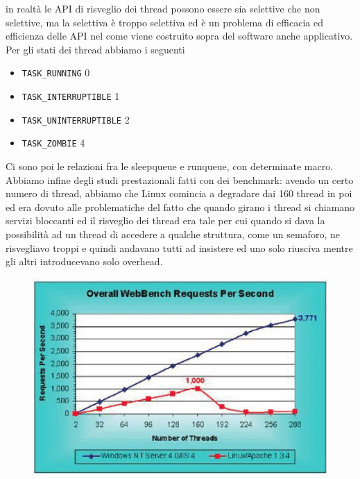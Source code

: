 \documentclass[12pt, oneside]{extbook}
\begin{document}
in realtà le API di risveglio dei thread possono essere sia selettive che non selettive, ma la selettiva è troppo selettiva ed è un problema di efficacia ed efficienza delle API nel come viene costruito sopra del software anche applicativo.\\Per gli stati dei thread abbiamo i seguenti
\begin{itemize}
\item \texttt{TASK\_RUNNING} 0
\item \texttt{TASK\_INTERRUPTIBLE}	1
\item \texttt{TASK\_UNINTERRUPTIBLE}	2
\item \texttt{TASK\_ZOMBIE} 4
\end{itemize}
Ci sono poi le relazioni fra le sleepqueue e runqueue, con determinate macro.\\Abbiamo infine degli studi prestazionali fatti con dei benchmark: avendo un certo numero di thread, abbiamo che Linux comincia a degradare dai 160 thread in poi ed era dovuto alle problematiche del fatto che quando girano i thread si chiamano servizi bloccanti ed il risveglio dei thread era tale per cui quando si dava la possibilità ad un thread di accedere a qualche struttura, come un semaforo, ne risvegliavo troppi e quindi andavano tutti ad insistere ed uno solo riusciva mentre gli altri introducevano solo overhead.
\begin{figure}[!h]
	\includegraphics[scale=.5]{immagini/malware_wins.png}
\end{figure}
\end{document}
